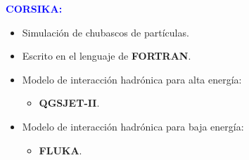     \begin{frame}{} %
        \justifying %
        \vspace*{-0.1cm} %

        \begin{columns}
            \begin{column}{0.5\textwidth} %
                \textcolor{blue}{\textbf{CORSIKA:}}
                \begin{itemize}
                    \item Simulación de chubascos de partículas.
                    \item Escrito en el lenguaje de \textbf{FORTRAN}.
                    \item Modelo de interacción hadrónica para alta energía:
                        \begin{itemize}
                            \item \textbf{QGSJET-II}.
                        \end{itemize}
                    \item Modelo de interacción hadrónica para baja energía:
                        \begin{itemize}
                            \item \textbf{FLUKA}.
                        \end{itemize}
                \end{itemize}
            \end{column}

            \begin{column}{0.5\textwidth} %
                \begin{figure}
                    
                \end{figure}              
            \end{column}
        \end{columns}
    \end{frame}  



